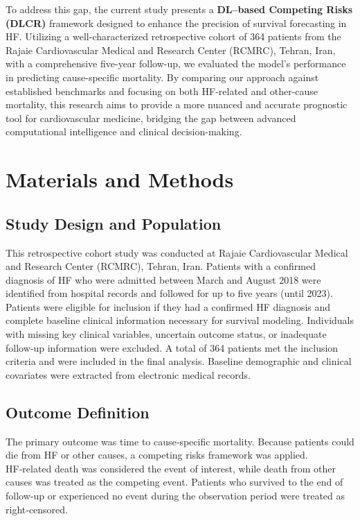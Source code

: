 \documentclass[twoside]{article}
\begin{document}
To address this gap, the current study presents a \textbf{DL--based Competing Risks (DLCR)} framework designed to enhance the precision of survival forecasting in HF. Utilizing a well-characterized retrospective cohort of 364  patients from the Rajaie Cardiovascular Medical and Research Center (RCMRC), Tehran, Iran, with a comprehensive five-year follow-up, we evaluated the model's performance in predicting cause-specific mortality. By comparing our approach against established benchmarks and focusing on both HF-related and other-cause mortality, this research aims to provide a more nuanced and accurate prognostic tool for cardiovascular medicine, bridging the gap between advanced computational intelligence and clinical decision-making.

\section{Materials and Methods}

\subsection{Study Design and Population}
This retrospective cohort study was conducted at Rajaie Cardiovascular Medical and Research Center (RCMRC), Tehran, Iran. Patients with a confirmed diagnosis of HF who were admitted between March and August 2018 were identified from hospital records and followed for up to five years (until 2023). 
Patients were eligible for inclusion if they had a confirmed HF diagnosis and complete baseline clinical information necessary for survival modeling. Individuals with missing key clinical variables, uncertain outcome status, or inadequate follow‑up information were excluded. A total of 364  patients met the inclusion criteria and were included in the final analysis. Baseline demographic and clinical covariates were extracted from electronic medical records.

\subsection{Outcome Definition}
The primary outcome was time to cause‑specific mortality. Because patients could die from HF or other causes, a competing risks framework was applied. HF‑related death was considered the event of interest, while death from other causes was treated as the competing event. Patients who survived to the end of follow‑up or experienced no event during the observation period were treated as right‑censored.
\end{document}
